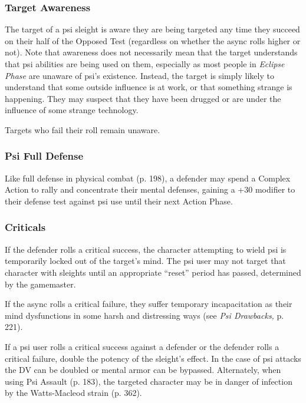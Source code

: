 \subsubsection{Target Awareness}

The target of a psi sleight is aware they are being 
targeted any time they succeed on their half of the 
Opposed Test (regardless on whether the async 
rolls higher or not). Note that awareness does not 
necessarily mean that the target understands that psi 
abilities are being used on them, especially as most 
people in \textit{Eclipse Phase} are unaware of psi's existence. 
Instead, the target is simply likely to understand that 
some outside influence is at work, or that something 
strange is happening. They may suspect that they 
have been drugged or are under the influence of some 
strange technology.

Targets who fail their roll remain unaware.

\subsubsection{Psi Full Defense}

Like full defense in physical combat (p. 198), a defender
may spend a Complex Action to rally and concentrate
their mental defenses, gaining a +30 modifier
to their defense test against psi use until their next 
Action Phase.

\subsubsection{Criticals}

If the defender rolls a critical success, the character 
attempting to wield psi is temporarily locked out of 
the target's mind. The psi user may not target that 
character with sleights until an appropriate ``reset'' 
period has passed, determined by the gamemaster.

If the async rolls a critical failure, they suffer temporary
incapacitation as their mind dysfunctions in some
harsh and distressing ways (see \textit{Psi Drawbacks,} p. 221).

If a psi user rolls a critical success against a defender
or the defender rolls a critical failure, double
the potency of the sleight's effect. In the case of psi attacks
the DV can be doubled or mental armor can be
bypassed. Alternately, when using Psi Assault (p. 183), 
the targeted character may be in danger of infection 
by the Watts-Macleod strain (p. 362).

